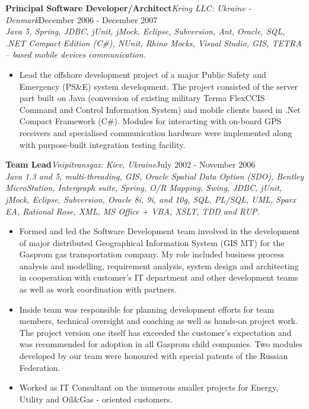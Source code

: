 \documentclass{res}
\newcommand{\jobdes}[4]{\needspace{3\baselineskip}%
{\noindent \bf #3\hspace{2ex}}{{\em \small #1}}{\hfill #2}\\{{\em \small #4.}}}
\begin{document}
\begin{resume}
\jobdes {Kring LLC: Ukraine - Denmark}{December 2006 - December 2007}{Principal Software Developer/Architect}
{Java 5, Spring, JDBC, jUnit, jMock, Eclipse, Subversion, Ant, Oracle, SQL, .NET Compact Edition (C\#), NUnit, Rhino Mocks, Visual Studio, GIS, TETRA – based mobile devices communication}
\begin{itemize} \itemsep -2pt %
 \item Lead the offshore development project of a major Public Safety and Emergency (PS\&E) system development. The project consisted of the server part built on Java (conversion of existing military Terma FlexCCIS Command and Control Information System) and mobile clients based in .Net Compact Framework (C\#). Modules for interacting with on-board GPS receivers and specialised communication hardware were implemented along with purpose-built integration testing facility.
\end{itemize}

\jobdes{Vnipitransgaz: Kiev, Ukraine}{July 2002 - November 2006}{Team Lead}
{Java 1.3 and 5, multi-threading, GIS, Oracle Spatial Data Option (SDO), Bentley MicroStation, Intergraph suite, Spring, O/R Mapping, Swing, JDBC, jUnit, jMock, Eclipse, Subversion, Oracle 8i, 9i, and 10g, SQL, PL/SQL, UML, Sparx EA, Rational Rose, XML, MS Office + VBA, XSLT, TDD and RUP}
\begin{itemize} \itemsep -2pt %
 \item Formed and led the Software Development team involved in the development of major distributed Geographical Information System (GIS MT) for the Gasprom gas transportation company. My role included business process analysis and modelling, requirement analysis, system design and architecting in cooperation with customer’s IT department and other development teams as well as work coordination with partners.
 \item Inside team was responsible for planning development efforts for team members, technical oversight and coaching as well as hands-on project work. The project version one itself has exceeded the customer’s expectation and was recommended for adoption in all Gasprom child companies. Two modules developed by our team were honoured with special patents of the Russian Federation.
 \item Worked as IT Consultant on the numerous smaller projects for Energy, Utility and Oil\&Gas - oriented customers.
\end{itemize}


\end{resume}
\end{document}
